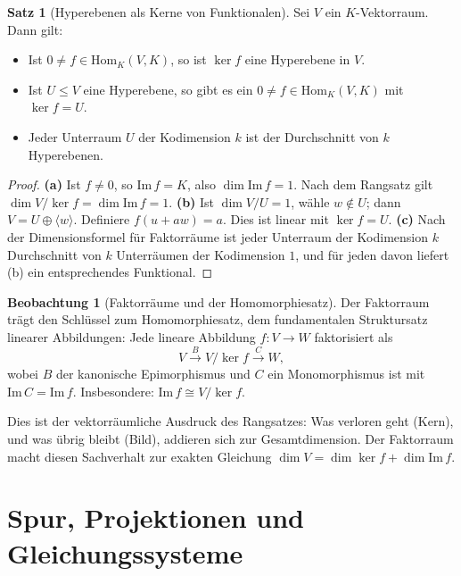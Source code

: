 ﻿\documentclass[a4paper,12pt]{report}
\theoremstyle{definition}
\newtheorem{satz}{Satz}
\newtheorem{beobachtung}{Beobachtung}
\begin{document}
\begin{satz}[Hyperebenen als Kerne von Funktionalen]
    Sei $V$ ein $K$-Vektorraum. Dann gilt:
    \begin{itemize}
        \item[-] Ist $0 \neq f \in \mathrm{Hom}_K(V, K)$, so ist $\ker f$
              eine Hyperebene in $V$.
        \item[-] Ist $U \leq V$ eine Hyperebene, so gibt es ein
              $0 \neq f \in \mathrm{Hom}_K(V, K)$ mit $\ker f = U$.
        \item[-] Jeder Unterraum $U$ der Kodimension $k$ ist der
              Durchschnitt von $k$ Hyperebenen.
    \end{itemize}
\end{satz}
\begin{proof}
    \textbf{(a)} Ist $f \neq 0$, so $\mathrm{Im}\, f = K$, also $\dim \mathrm{Im}\, f = 1$.
    Nach dem Rangsatz gilt $\dim V/\ker f = \dim \mathrm{Im}\, f = 1$.
    \textbf{(b)} Ist $\dim V/U = 1$, wähle $w \notin U$; dann $V = U \oplus \langle w \rangle$.
    Definiere $f(u + aw) = a$. Dies ist linear mit $\ker f = U$.
    \textbf{(c)} Nach der Dimensionsformel für Faktorräume ist jeder Unterraum der
    Kodimension $k$ Durchschnitt von $k$ Unterräumen der Kodimension $1$,
    und für jeden davon liefert (b) ein entsprechendes Funktional.
\end{proof}


\begin{beobachtung}[Faktorräume und der Homomorphiesatz]
    Der Faktorraum trägt den Schlüssel zum Homomorphiesatz, dem
    fundamentalen Struktursatz linearer Abbildungen: Jede lineare
    Abbildung $f : V \to W$ faktorisiert als
    \[
        V \xrightarrow{B} V/\ker f \xrightarrow{C} W,
    \]
    wobei $B$ der kanonische Epimorphismus und $C$ ein Monomorphismus ist
    mit $\mathrm{Im}\, C = \mathrm{Im}\, f$. Insbesondere:
    $\mathrm{Im}\, f \cong V / \ker f$.

    Dies ist der vektorräumliche Ausdruck des Rangsatzes: Was verloren geht
    (Kern), und was übrig bleibt (Bild), addieren sich zur Gesamtdimension.
    Der Faktorraum macht diesen Sachverhalt zur exakten Gleichung
    $\dim V = \dim \ker f + \dim \mathrm{Im}\, f$.
\end{beobachtung}

\chapter{Spur, Projektionen und Gleichungssysteme}
\end{document}
